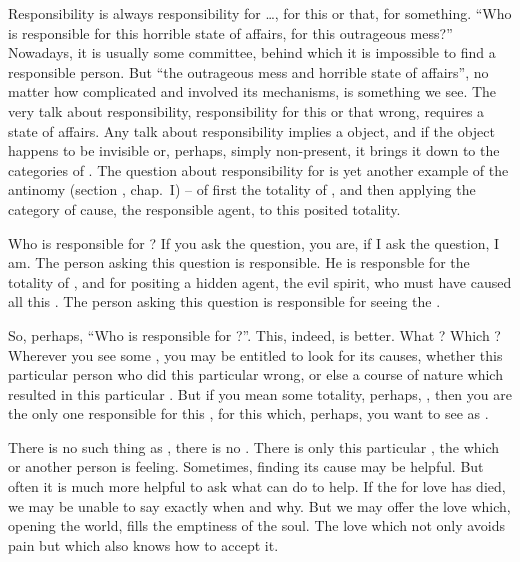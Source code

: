 {{

\pa Responsibility is always responsibility for \ldots, for this or
that, for something.  ``Who is responsible for this horrible state of
affairs, for this outrageous mess?''  Nowadays, it is usually some
committee, behind which it is impossible to find a responsible person. 
But ``the outrageous mess and horrible state of affairs'', no matter how complicated and
involved its mechanisms, is something we  see.  The very
talk about responsibility, responsibility for this or that wrong,
requires a  state of affairs.  Any talk about
responsibility implies a  object, and if the object
happens to be invisible or, perhaps, simply non-present, it brings it
down to the categories of .  The question about
responsibility for  is yet another example of the antinomy
(section , chap.~I) -- of first 
the totality of , and then applying the category of
 cause, the responsible agent, to this posited totality.

\pa
Who is responsible for ?  If
you ask the question, you are, if I ask the question, I am. The 
person asking this question is responsible. He is responsble for 
 the totality of , and for positing a hidden agent, 
the evil spirit, who must have caused all this . 
The person 
asking this question is responsible for seeing the . 

\pa
So, perhaps, ``Who is responsible for ?''.  This, indeed, is
better.  What ?  Which ?  Wherever you see some
, you may be entitled to look for its causes, whether this
particular person who did this particular wrong, or else a course of
nature which resulted in this particular .  But if you mean
some totality, perhaps, , then you are the 
only one responsible for this , for this 
  which, perhaps, you want to see as 
.

\pa There is no such thing as , there is no
.  There is only this particular , 
the  which  or another person is  feeling. 
Sometimes, finding its cause may be helpful.  But often it is much
more helpful to ask what  can do to help.  If the  for
love has died, we may be unable to say exactly when and why.  But we
may offer the love which, opening the world, fills the emptiness
of the soul.  The love which not only avoids pain but which also 
knows how to accept it.


}}
